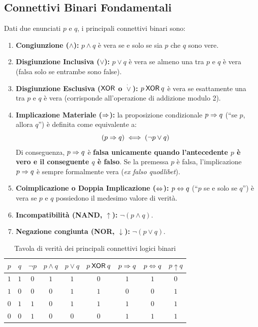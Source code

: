 \subsection{Connettivi Binari Fondamentali}
Dati due enunciati $p$ e $q$, i principali connettivi binari sono:
\begin{enumerate}
    \item \textbf{Congiunzione ($\wedge$):} $p \wedge q$ è vera se e solo se sia $p$ che $q$ sono vere.
    \item \textbf{Disgiunzione Inclusiva ($\vee$):} $p \vee q$ è vera se almeno una tra $p$ e $q$ è vera (falsa solo se entrambe sono false).
    \item \textbf{Disgiunzione Esclusiva ($\mathbin{\mathsf{XOR}}$ o $\dot{\vee}$):} $p \mathbin{\mathsf{XOR}} q$ è vera se esattamente una tra $p$ e $q$ è vera (corrisponde all'operazione di addizione modulo 2).
    \item \textbf{Implicazione Materiale ($\Rightarrow$):} la proposizione condizionale $p \Rightarrow q$ (``se $p$, allora $q$'') è definita come equivalente a:
    \[
        (p \Rightarrow q) \iff (\neg p \vee q)
    \]
    Di conseguenza, $p \Rightarrow q$ è \textbf{falsa unicamente quando l'antecedente $p$ è vero e il conseguente $q$ è falso}. Se la premessa $p$ è falsa, l'implicazione $p \Rightarrow q$ è sempre formalmente vera (\emph{ex falso quodlibet}).
    \item \textbf{Coimplicazione o Doppia Implicazione ($\Leftrightarrow$):} $p \Leftrightarrow q$ (``$p$ se e solo se $q$'') è vera se $p$ e $q$ possiedono il medesimo valore di verità.
    \item \textbf{Incompatibilità (NAND, $\uparrow$):} $\neg (p \wedge q)$.
    \item \textbf{Negazione congiunta (NOR, $\downarrow$):} $\neg (p \vee q)$.
\end{enumerate}

\begin{table}[htbp]
\centering
\caption{Tavola di verità dei principali connettivi logici binari}
\label{tab:tavola_verita}
\begin{tabular}{|cc||c|c|c|c|c|c|c|}
\hline
$p$ & $q$ & $\neg p$ & $p \wedge q$ & $p \vee q$ & $p \mathbin{\mathsf{XOR}} q$ & $p \Rightarrow q$ & $p \Leftrightarrow q$ & $p \uparrow q$ \\
\hline
$1$ & $1$ & $0$ & $1$ & $1$ & $0$ & $1$ & $1$ & $0$ \\
$1$ & $0$ & $0$ & $0$ & $1$ & $1$ & $0$ & $0$ & $1$ \\
$0$ & $1$ & $1$ & $0$ & $1$ & $1$ & $1$ & $0$ & $1$ \\
$0$ & $0$ & $1$ & $0$ & $0$ & $0$ & $1$ & $1$ & $1$ \\
\hline
\end{tabular}
\end{table}

